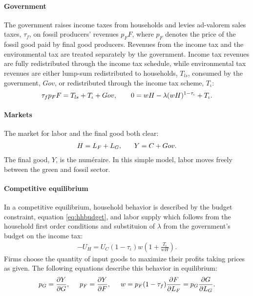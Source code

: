 \paragraph{Government}
The government raises income taxes from households and levies ad-valorem sales taxes, $\tau_f$, on fossil producers' revenues $p_FF$, where $p_F$ denotes the price of the fossil good paid by final good producers. Revenues from the income tax and the environmental tax are treated separately by the government. Income tax revenues are fully redistributed through the income tax schedule, while environmental tax revenues are either lump-sum redistributed to households, $T_{ls}$, consumed by the government, $Gov$, or redistributed through the income tax scheme, $T_\iota$:
\begin{align}
\tau_{f}p_FF=T_{ls}+T_\iota+Gov, \hspace{7mm}
0={w H}-\lambda(w H)^{1-\tau_{\iota}}+T_\iota. \label{eq:gov_but}
\end{align}

\paragraph{Markets}
The market for labor and the final good both clear: 
\begin{align}
H=L_F+L_G,\ \hspace{5mm} Y=C+Gov. \label{eq:market_clear}
\end{align}
 The final good, $Y$, is the numéraire. In this simple model, labor moves freely between the green and fossil sector. 
\paragraph{Competitive equilibrium}
In a competitive equilibrium, household behavior is described by the budget constraint, equation \ref{eq:hhbudget}, and labor supply which follows from the household first order conditions and substituion of $\lambda$ from the government's budget on the income tax:
\begin{align}
-U_H=U_C(1-\tau_{\iota})w\left(1+\frac{T_\iota}{wH}\right). \label{eq:hsup}
\end{align}
Firms choose the quantity of input goods to maximize their profits taking prices as given. The following equations describe this behavior in equilibrium:
\begin{align}
p_G=\frac{\partial Y}{\partial G}, \hspace{5mm}
p_F = \frac{\partial Y}{\partial F}, \hspace{5mm}
w= p_F(1-\tau_f)\frac{\partial F}{\partial L_F}=p_G\frac{\partial G}{\partial L_G}.\label{eq:profmax}
\end{align}


